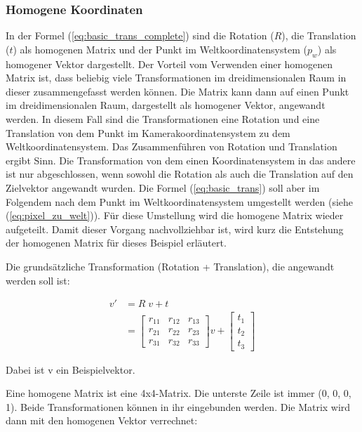 	\subsubsection{Homogene Koordinaten}
	In der Formel (\ref{eq:basic_trans_complete}) sind die Rotation (\( R \)), die Translation (\( t \)) als homogenen Matrix und  der Punkt im Weltkoordinatensystem (\( p_w \)) als homogener Vektor dargestellt. Der Vorteil vom Verwenden einer homogenen Matrix ist, dass beliebig viele Transformationen im dreidimensionalen Raum in dieser zusammengefasst werden können. Die Matrix kann dann auf einen Punkt im dreidimensionalen Raum, dargestellt als homogener Vektor, angewandt werden. In diesem Fall sind die Transformationen eine Rotation und eine Translation von dem Punkt im Kamerakoordinatensystem zu dem Weltkoordinatensystem. Das Zusammenführen von Rotation und Translation ergibt Sinn. Die Transformation von dem einen Koordinatensystem in das andere ist nur abgeschlossen, wenn sowohl die Rotation als auch die Translation auf den Zielvektor angewandt wurden. Die Formel (\ref{eq:basic_trans}) soll aber im Folgendem nach dem Punkt im Weltkoordinatensystem umgestellt werden (siehe (\ref{eq:pixel_zu_welt})). Für diese Umstellung wird die homogene Matrix wieder aufgeteilt. Damit dieser Vorgang nachvollziehbar ist, wird kurz die Entstehung der homogenen Matrix für dieses Beispiel erläutert.
	
	Die grundsätzliche Transformation (Rotation + Translation), die angewandt werden soll ist:
	
	\begin{equation}
	\begin{aligned}
	v' &= R \; v + t \\
	&= \begin{bmatrix}
	r_{11} & r_{12} & r_{13} \\ 
	r_{21} & r_{22} & r_{23} \\ 
	r_{31} & r_{32} & r_{33}
	\end{bmatrix} v + \begin{bmatrix}
	t_1 \\ t_2 \\ t_3
	\end{bmatrix}
	\end{aligned}
	\label{eq:rot_trans}
	\end{equation}
	
	Dabei ist v ein Beispielvektor.
	
	Eine homogene Matrix ist eine 4x4-Matrix. Die unterste Zeile ist immer (0, 0, 0, 1). Beide Transformationen können in ihr eingebunden werden. Die Matrix wird dann mit den homogenen Vektor verrechnet:
	
